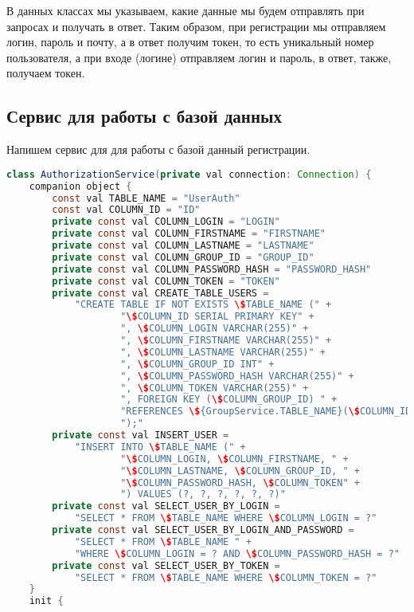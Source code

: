 В данных классах мы указываем, какие данные мы будем отправлять
при запросах и получать в ответ. 
Таким образом, при регистрации мы отправляем логин, пароль и почту,
а в ответ получим токен, то есть уникальный номер пользователя, а при входе
(логине) отправляем логин и пароль, в ответ, также, получаем токен.

\subsection{Сервис для работы с базой данных}

Напишем сервис для для работы с базой данный регистрации.

\begin{lstlisting}[language=Java]
class AuthorizationService(private val connection: Connection) {
    companion object {
        const val TABLE_NAME = "UserAuth"
        const val COLUMN_ID = "ID"
        private const val COLUMN_LOGIN = "LOGIN"
        private const val COLUMN_FIRSTNAME = "FIRSTNAME"
        private const val COLUMN_LASTNAME = "LASTNAME"
        private const val COLUMN_GROUP_ID = "GROUP_ID"
        private const val COLUMN_PASSWORD_HASH = "PASSWORD_HASH"
        private const val COLUMN_TOKEN = "TOKEN"
        private const val CREATE_TABLE_USERS =
            "CREATE TABLE IF NOT EXISTS \$TABLE_NAME (" +
                    "\$COLUMN_ID SERIAL PRIMARY KEY" +
                    ", \$COLUMN_LOGIN VARCHAR(255)" +
                    ", \$COLUMN_FIRSTNAME VARCHAR(255)" +
                    ", \$COLUMN_LASTNAME VARCHAR(255)" +
                    ", \$COLUMN_GROUP_ID INT" +
                    ", \$COLUMN_PASSWORD_HASH VARCHAR(255)" +
                    ", \$COLUMN_TOKEN VARCHAR(255)" +
                    ", FOREIGN KEY (\$COLUMN_GROUP_ID) " +
					"REFERENCES \${GroupService.TABLE_NAME}(\$COLUMN_ID)" +
                    ");"
        private const val INSERT_USER =
            "INSERT INTO \$TABLE_NAME (" +
                    "\$COLUMN_LOGIN, \$COLUMN_FIRSTNAME, " +
					"\$COLUMN_LASTNAME, \$COLUMN_GROUP_ID, " +
					"\$COLUMN_PASSWORD_HASH, \$COLUMN_TOKEN" +
                    ") VALUES (?, ?, ?, ?, ?, ?)"
        private const val SELECT_USER_BY_LOGIN =
            "SELECT * FROM \$TABLE_NAME WHERE \$COLUMN_LOGIN = ?"
        private const val SELECT_USER_BY_LOGIN_AND_PASSWORD =
            "SELECT * FROM \$TABLE_NAME " +
			"WHERE \$COLUMN_LOGIN = ? AND \$COLUMN_PASSWORD_HASH = ?"
        private const val SELECT_USER_BY_TOKEN =
            "SELECT * FROM \$TABLE_NAME WHERE \$COLUMN_TOKEN = ?"
    }
    init {

\end{lstlisting}
